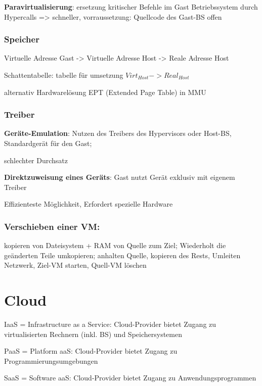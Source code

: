 \textbf{Paravirtualisierung}: ersetzung kritischer Befehle im Gast Betriebssystem durch Hypercalls 
=> schneller, vorraussetzung: Quellcode des Gast-BS offen

\subsubsection{Speicher}
Virtuelle Adresse Gast -> Virtuelle Adresse Host -> Reale Adresse Host

Schattentabelle: tabelle für umsetzung $Virt_{Host} -> Real_{Host}$

alternativ Hardwarelösung EPT (Extended Page Table) in MMU

\subsubsection{Treiber}
\textbf{Geräte-Emulation}: Nutzen des Treibers des Hypervisors oder Host-BS, Standardgerät für den Gast; 

schlechter Durchsatz

\textbf{Direktzuweisung eines Geräts}: Gast nutzt Gerät exklusiv mit eigenem Treiber

Effizienteste Möglichkeit, Erfordert spezielle Hardware


\subsubsection{Verschieben einer VM:} kopieren von Dateisystem + RAM von Quelle zum Ziel;
Wiederholt die geänderten Teile umkopieren; anhalten Quelle, kopieren des Rests, Umleiten Netzwerk, Ziel-VM starten, Quell-VM löschen

\section{Cloud}
IaaS = Infrastructure as a Service: Cloud-Provider bietet Zugang zu virtualisierten Rechnern (inkl. BS)
und Speichersystemen

PaaS = Platform aaS: Cloud-Provider bietet Zugang zu Programmierungsumgebungen

SaaS = Software aaS: Cloud-Provider bietet Zugang zu Anwendungsprogrammen
